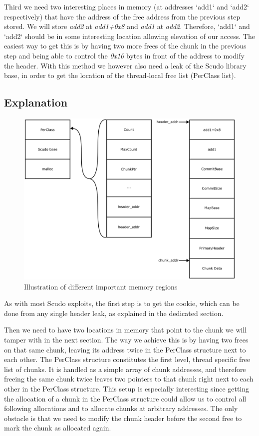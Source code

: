 \documentclass[a4paper,11pt,oneside]{report}
\begin{document}
Third we need two interesting places in memory (at addresses `add1` and `add2`
respectively) that have the address of the free address from the previous step stored. We
will store \emph{add2} at \emph{add1+0x8} and \emph{add1} at \emph{add2}. Therefore, `add1`
and `add2` should be in some interesting location allowing elevation of our access.  The
easiest way to get this is by having two more frees of the chunk in the previous step and
being able to control the \emph{0x10} bytes in front of the address to modify the
header. With this method we however also need a leak of the Scudo library base, in order to
get the location of the thread-local free list (PerClass list).

\subsection{Explanation}

\begin{figure}[h!]
  \centering
  \includegraphics[width=\linewidth]{figures/SafeUnlinkMemory.png}
  \caption{Illustration of different important memory regions}
  \label{fig:SafeUnlinkMemory}
\end{figure}

As with most Scudo exploits, the first step is to get the cookie, which can be done from
any single header leak, as explained in the dedicated section.

Then we need to have two locations in memory that point to the chunk we will tamper with
in the next section. The way we achieve this is by having two frees on that same chunk,
leaving its address twice in the PerClass structure next to each other. The PerClass
structure constitutes the first level, thread specific free list of chunks. It is handled
as a simple array of chunk addresses, and therefore freeing the same chunk twice leaves
two pointers to that chunk right next to each other in the PerClass structure. This setup
is especially interesting since getting the allocation of a chunk in the PerClass
structure could allow us to control all following allocations and to allocate chunks at
arbitrary addresses. The only obstacle is that we need to modify the chunk header before
the second free to mark the chunk as allocated again.
\end{document}
